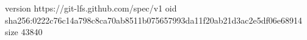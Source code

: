 version https://git-lfs.github.com/spec/v1
oid sha256:0222c76c14a798c8ca70ab8511b075657993da11f20ab21d3ac2e5df06e68914
size 43840
